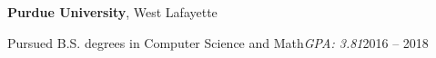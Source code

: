   \vspace{5pt}
  \textbf{Purdue University}, West Lafayette
  \vspace{2pt}
  \begin{adjustwidth}{10pt}{}
    Pursued B.S. degrees in Computer Science and Math\quad\emph{GPA: 3.81}\hfill{}2016 -- 2018


  \end{adjustwidth}



















